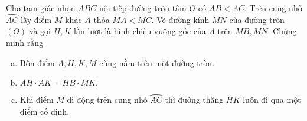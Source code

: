 \begin{bt}%
Cho tam giác nhọn $ABC$ nội tiếp đường tròn tâm $O$ có $AB<AC.$ Trên cung nhỏ $\wideparen{AC}$ lấy điểm $M$ khác $A$ thỏa $MA<MC$. Vẽ đường kính $MN$ của đường tròn $(O)$ và gọi $H,K$ lần lượt là hình chiếu vuông góc của $A$ trên $MB,MN.$ Chứng minh rằng
\begin{enumerate}[a)]
\item Bốn điểm $A,H,K,M$ cùng nằm trên một đường tròn.
\item $AH\cdot AK=HB \cdot MK.$
\item Khi điểm $M$ di động trên cung nhỏ $\wideparen{AC}$ thì đường thẳng $HK$ luôn đi qua một điểm cố định.
\end{enumerate}
\end{bt}
